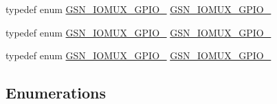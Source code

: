 \begin{DoxyCompactItemize}
\item 
typedef enum \hyperlink{a00519_a959c5ad68f54cc1d3cc77fb390107d74}{GSN\_\-IOMUX\_\-GPIO\_} \hyperlink{a00519_abf31e3b7c30bfef76105e4dac434662e}{GSN\_\-IOMUX\_\-GPIO\_}
\item 
typedef enum \hyperlink{a00519_a7fb289e492a453336f6f5075c2b9745e}{GSN\_\-IOMUX\_\-GPIO\_} \hyperlink{a00519_ad52e435cb7d2cf1a67907c7fab933d70}{GSN\_\-IOMUX\_\-GPIO\_}
\item 
typedef enum \hyperlink{a00519_a7ddef78d187dcfeb85d9e19b4d2bd5ac}{GSN\_\-IOMUX\_\-GPIO\_} \hyperlink{a00519_a9ee65573b47bd3602bf7eddcebd68e3a}{GSN\_\-IOMUX\_\-GPIO\_}
\end{DoxyCompactItemize}
\subsection*{Enumerations}
